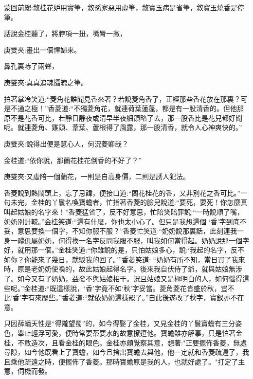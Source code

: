 
\begin{parag}
    \begin{note}蒙回前總:敘桂花妒用實筆，敘孫家惡用虛筆，敘寶玉病是省筆，敘寶玉燒香是停筆。\end{note}
\end{parag}


\begin{parag}
    話說金桂聽了，將脖項一扭，嘴脣一撇，\begin{note}庚雙夾:畫出一個悍婦來。\end{note}鼻孔裏哧了兩聲，\begin{note}庚雙夾:真真追魂攝魄之筆。\end{note}拍著掌冷笑道:“菱角花誰聞見香來著？若說菱角香了，正經那些香花放在那裏？可是不通之極！”香菱道:“不獨菱角花，就連荷葉蓮蓬，都是有一股清香的。但他那原不是花香可比，若靜日靜夜或清早半夜細領略了去，那一股香比是花兒都好聞呢。就連菱角、雞頭、葦葉、蘆根得了風露，那一股清香，就令人心神爽快的。”\begin{note}庚雙夾:說得出便是慧心人，何況菱卿哉？\end{note}金桂道:“依你說，那蘭花桂花倒香的不好了？”\begin{note}庚雙夾:又虛陪一個蘭花，一則是自高身價，二則是誘人犯法。\end{note}香菱說到熱鬧頭上，忘了忌諱，便接口道:“蘭花桂花的香，又非別花之香可比。”一句未完，金桂的丫鬟名喚寶蟾者，忙指著香菱的臉兒說道:“要死，要死！你怎麼真叫起姑娘的名字來！”香菱猛省了，反不好意思，忙陪笑賠罪說:“一時說順了嘴，奶奶別計較。”金桂笑道:“這有什麼，你也太小心了。但只是我想這個 ‘香’字到底不妥，意思要換一個字，不知你服不服？”香菱忙笑道:“奶奶說那裏話，此刻連我一身一體俱屬奶奶，何得換一名字反問我服不服，叫我如何當得起。奶奶說那一個字好，就用那一個。”金桂笑道:“你雖說的是，只怕姑娘多心，說:‘我起的名字，反不如你？你能來了幾日，就駁我的回了。’”香菱笑道: “奶奶有所不知，當日買了我來時，原是老奶奶使喚的，故此姑娘起得名字。後來我自伏侍了爺，就與姑娘無涉了。如今又有了奶奶，益發不與姑娘相干。況且姑娘又是極明白的人，如何惱得這些呢。”金桂道:“既這樣說，‘香’字竟不如‘秋’字妥當。菱角菱花皆盛於秋，豈不比‘香’字有來歷些。”香菱道:“就依奶奶這樣罷了。”自此後遂改了秋字，寶釵亦不在意。
\end{parag}


\begin{parag}
    只因薛蟠天性是“得隴望蜀”的，如今得娶了金桂，又見金桂的丫鬟寶蟾有三分姿色，舉止輕浮可愛，便時常要茶要水的故意撩逗他。寶蟾雖亦解事，只是怕著金桂，不敢造次，且看金桂的眼色。金桂亦頗覺察其意，想著:"正要擺佈香菱，無處尋隙，如今他既看上了寶蟾，如今且捨出寶蟾去與他，他一定就和香菱疏遠了，我且乘他疏遠之時，便擺佈了香菱。那時寶蟾原是我的人，也就好處了。"打定了主意，伺機而發。
\end{parag}


